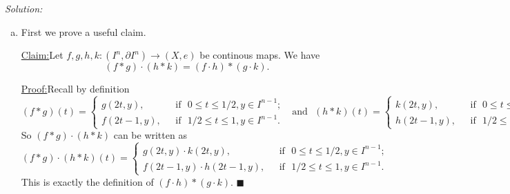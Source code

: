\documentclass[a4paper, 12pt]{article}
\newenvironment{solution}
    {\textit{Solution:}}
    {}
\newenvironment{claim}[1]{\par\noindent\underline{Claim:}\space#1}{}
\newenvironment{claimproof}[1]{\par\noindent\underline{Proof:}\space#1}{\hfill $\blacksquare$}
\newcommand{\iif}{\ \ \ \text{if}\ \ \ }
\begin{document}
\begin{solution}
\begin{enumerate}[(a)]
\item 
First we prove a useful claim. 
\begin{claim}
Let \(f,g,h,k:(I^n,\partial I^n)\rightarrow (X,e)\) be continous maps. We have 
\[(f*g)\cdot (h*k)=(f\cdot h)*(g\cdot k).\]
\end{claim}
\begin{claimproof}
Recall by definition 
\[(f*g)(t)=\begin{cases}
	g(2t,y),&\iif 0\leq t\leq 1/2, y\in I^{n-1};\\
	f(2t-1,y),&\iif 1/2\leq t\leq 1, y\in I^{n-1}.
\end{cases}\ \ \ \text{and}\ \ \ (h*k)(t)=\begin{cases}
    k(2t,y),&\iif 0\leq t\leq 1/2, y\in I^{n-1};\\ 
	h(2t-1,y),&\iif 1/2\leq t\leq 1, y\in I^{n-1}.
\end{cases}\]
So \((f*g)\cdot (h*k)\) can be written as 
\[(f*g)\cdot (h*k)(t)=\begin{cases}
	g(2t,y)\cdot k(2t,y),&\iif 0\leq t\leq 1/2, y\in I^{n-1};\\ 
    f(2t-1,y)\cdot h(2t-1,y),&\iif 1/2\leq t\leq 1, y\in I^{n-1}.
\end{cases}\]
This is exactly the definition of \((f\cdot h)*(g\cdot k)\).
\end{claimproof}


\end{enumerate}
\end{solution}
\end{document}

